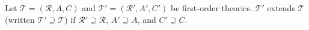 Let $\mathcal{T} = (\mathcal{R}, A, C)$ and $\mathcal{T}' = (\mathcal{R}', A', C')$ be first-order theories. $\mathcal{T}'$ extends $\mathcal{T}$ (written $\mathcal{T}' \supseteq \mathcal{T}$) if $\mathcal{R}' \supseteq \mathcal{R}$, $A' \supseteq A$, and $C' \supseteq C$.

